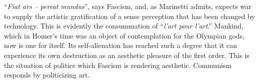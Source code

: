\documentclass[11pt, letterpaper]{article}
\begin{document}
“\textit{Fiat ars – pereat mundus}”, says Fascism, and, as Marinetti admits,
expects war to supply the artistic gratification of a sense perception that has
been changed by technology. This is evidently the consummation of
“\textit{l’art pour l’art}.” Mankind, which in Homer’s time was an object of
contemplation for the Olympian gods, now is one for itself. Its self-alienation
has reached such a degree that it can experience its own destruction as an
aesthetic pleasure of the first order. This is the situation of politics which
Fascism is rendering aesthetic. Communism responds by politicizing art.
\end{document}
